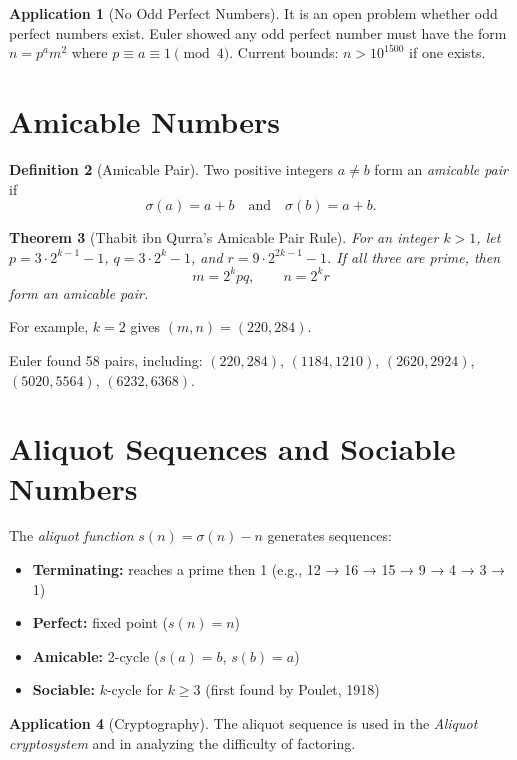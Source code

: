\documentclass[11pt,a4paper,twoside]{book}
\theoremstyle{eulerstyle}
\newtheorem{theorem}{Theorem}[chapter]
\theoremstyle{definition}
\newtheorem{definition}[theorem]{Definition}
\newtheorem{application}[theorem]{Application}
\begin{document}
\begin{application}[No Odd Perfect Numbers]
It is an open problem whether odd perfect numbers exist. Euler showed any odd perfect number must have the form $n = p^a m^2$ where $p \equiv a \equiv 1 \pmod{4}$. Current bounds: $n > 10^{1500}$ if one exists.
\end{application}

\section{Amicable Numbers}

\begin{definition}[Amicable Pair]
Two positive integers $a \neq b$ form an \emph{amicable pair} if
\[
\sigma(a) = a + b \quad \text{and} \quad \sigma(b) = a + b.
\]
\end{definition}

\begin{theorem}[Thabit ibn Qurra's Amicable Pair Rule]
For an integer $k>1$, let $p = 3\cdot 2^{k-1}-1$, $q = 3\cdot 2^k-1$,
and $r = 9\cdot 2^{2k-1}-1$. If all three are prime, then
\[
m = 2^k p q, \qquad n = 2^k r
\]
form an amicable pair.
\end{theorem}
For example, $k=2$ gives $(m,n)=(220,284)$.

Euler found 58 pairs, including:
$(220, 284)$, $(1184, 1210)$, $(2620, 2924)$, $(5020, 5564)$, $(6232, 6368)$.

\section{Aliquot Sequences and Sociable Numbers}

The \emph{aliquot function} $s(n) = \sigma(n) - n$ generates sequences:
\begin{itemize}
    \item \textbf{Terminating:} reaches a prime then 1 (e.g., 12 → 16 → 15 → 9 → 4 → 3 → 1)
    \item \textbf{Perfect:} fixed point ($s(n) = n$)
    \item \textbf{Amicable:} 2-cycle ($s(a) = b$, $s(b) = a$)
    \item \textbf{Sociable:} $k$-cycle for $k \ge 3$ (first found by Poulet, 1918)
\end{itemize}

\begin{application}[Cryptography]
The aliquot sequence is used in the \emph{Aliquot cryptosystem} and in analyzing the difficulty of factoring.
\end{application}
\end{document}
